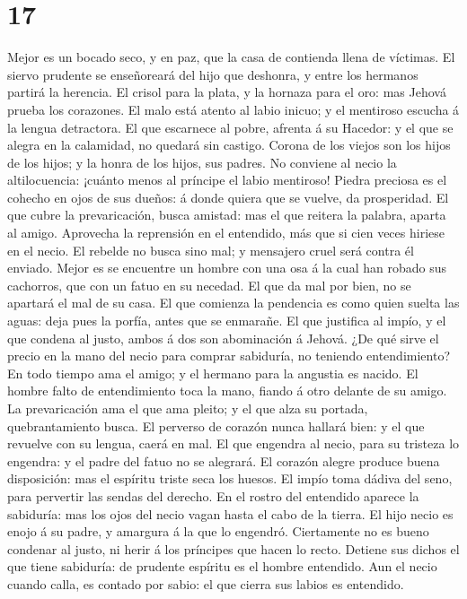 \hypertarget{section-16}{%
\section{17}\label{section-16}}

 Mejor es un bocado seco, y en paz, que la casa de
contienda llena de víctimas.  El siervo prudente se
enseñoreará del hijo que deshonra, y entre los hermanos partirá la
herencia.  El crisol para la plata, y la hornaza para el
oro: mas Jehová prueba los corazones.  El malo está atento
al labio inicuo; y el mentiroso escucha á la lengua detractora.
 El que escarnece al pobre, afrenta á su Hacedor: y el que
se alegra en la calamidad, no quedará sin castigo.  Corona
de los viejos son los hijos de los hijos; y la honra de los hijos, sus
padres.  No conviene al necio la altilocuencia: ¡cuánto
menos al príncipe el labio mentiroso!  Piedra preciosa es
el cohecho en ojos de sus dueños: á donde quiera que se vuelve, da
prosperidad.  El que cubre la prevaricación, busca
amistad: mas el que reitera la palabra, aparta al amigo. 
Aprovecha la reprensión en el entendido, más que si cien veces hiriese
en el necio.  El rebelde no busca sino mal; y mensajero
cruel será contra él enviado.  Mejor es se encuentre un
hombre con una osa á la cual han robado sus cachorros, que con un fatuo
en su necedad.  El que da mal por bien, no se apartará el
mal de su casa.  El que comienza la pendencia es como
quien suelta las aguas: deja pues la porfía, antes que se enmarañe.
 El que justifica al impío, y el que condena al justo,
ambos á dos son abominación á Jehová.  ¿De qué sirve el
precio en la mano del necio para comprar sabiduría, no teniendo
entendimiento?  En todo tiempo ama el amigo; y el hermano
para la angustia es nacido.  El hombre falto de
entendimiento toca la mano, fiando á otro delante de su amigo.
 La prevaricación ama el que ama pleito; y el que alza su
portada, quebrantamiento busca.  El perverso de corazón
nunca hallará bien: y el que revuelve con su lengua, caerá en mal.
 El que engendra al necio, para su tristeza lo engendra:
y el padre del fatuo no se alegrará.  El corazón alegre
produce buena disposición: mas el espíritu triste seca los huesos.
 El impío toma dádiva del seno, para pervertir las sendas
del derecho.  En el rostro del entendido aparece la
sabiduría: mas los ojos del necio vagan hasta el cabo de la tierra.
 El hijo necio es enojo á su padre, y amargura á la que
lo engendró.  Ciertamente no es bueno condenar al justo,
ni herir á los príncipes que hacen lo recto.  Detiene sus
dichos el que tiene sabiduría: de prudente espíritu es el hombre
entendido.  Aun el necio cuando calla, es contado por
sabio: el que cierra sus labios es entendido.

